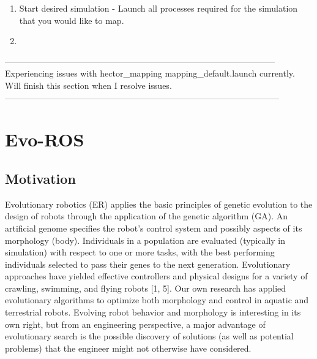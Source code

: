 \documentclass{report}
\begin{document}
\begin{enumerate}
	\item Start desired simulation - Launch all processes required for the simulation that you would like to map.
	
	\item 
\end{enumerate}

-----------------------------------------------------------------------------------------------\\
Experiencing issues with hector\_mapping mapping\_default.launch currently. Will finish this section when I resolve issues.\\
------------------------------------------------------------------------------------------------\\
\fi

\chapter{Evo-ROS}
\section{Motivation}
Evolutionary robotics (ER) applies the basic principles of genetic evolution to the design of robots through the application of the genetic algorithm (GA). An artificial genome specifies the robot’s control system and possibly aspects of its morphology (body). Individuals in a population are evaluated (typically in simulation) with respect to one or more tasks, with the best performing individuals selected to pass their genes
to the next generation. Evolutionary approaches have yielded effective controllers and physical designs for a variety of crawling, swimming, and flying robots [1, 5]. Our own research has applied evolutionary algorithms to optimize both morphology and control in aquatic and terrestrial robots. Evolving robot behavior and morphology is interesting in its own right, but from an engineering perspective, a major advantage of evolutionary search is the possible discovery of solutions (as well as potential problems) that the engineer might not otherwise have considered. 
\end{document}
